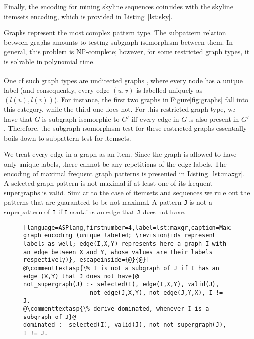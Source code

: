 \normalsize{Finally, %
the encoding for mining skyline sequences coincides with the skyline itemsets encoding, which is provided in Listing~\ref{lst:sky}. 


\normalsize{} Graphs represent the most complex pattern type. The subpattern relation between graphs amounts to testing subgraph isomorphism between them. In general, this problem is NP-complete; however, for some restricted graph types, it is solvable in polynomial time.

\paragraph{} One of such graph types are undirected graphs \parencite{DBLP:journals/corr/abs-1709-00900}, where every node has a unique label (and consequently, every edge $(u, v)$ is labelled uniquely as $(l(u),l(v))$). For instance, the first two graphs in Figure\ref{fig:graphs} fall into this category, while the third one does not. For this restricted graph type, we have that $G$ is subgraph isomorphic to $G'$ iff every edge in $G$ is also present in $G'$. Therefore, the subgraph isomorphism test for these restricted graphs essentially boils down to subpattern test for itemsets.

We treat every edge in a graph as an item. Since the graph is allowed to have only unique labels, there cannot be any repetitions of the edge labels. The encoding of maximal frequent graph patterns is presented in Listing~\ref{lst:maxgr}. A selected graph pattern is not maximal if at least one of its frequent supergraphs is valid. Similar to the case of itemsets and sequences we rule out the patterns that are guaranteed to be not maximal. A pattern \texttt{J} is not a superpattern of \texttt{I} if \texttt{I} contains an edge that \texttt{J} does not have.  

\begin{figure}[t]
    \small{\begin{lstlisting}[language=ASPlang,firstnumber=4,label=lst:maxgr,caption=Maximal graph encoding (unique labeled; \revision{ids represent labels as well; edge(I,X,Y) represents here a graph I with an edge between X and Y, whose values are their labels respectively)}, escapeinside={@}{@}]
@\commenttextasp{\% I is not a subgraph of J if I has an edge (X,Y) that J does not have}@
not_supergraph(J) :- selected(I), edge(I,X,Y), valid(J),
                   not edge(J,X,Y), not edge(J,Y,X), I != J.
@\commenttextasp{\% derive dominated, whenever I is a subgraph of J}@
dominated :- selected(I), valid(J), not not_supergraph(J), I != J.
\end{lstlisting}}
\end{figure}

}
